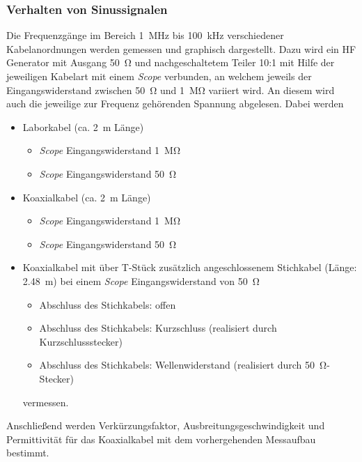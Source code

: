 \documentclass[a4paper,twoside,final]{article}
\begin{document}
\subsubsection{Verhalten von Sinussignalen}
Die Frequenzgänge im Bereich \SI{1}{\mega\hertz} bis \SI{100}{\kilo\hertz} verschiedener Kabelanordnungen werden gemessen und graphisch dargestellt. Dazu wird ein HF Generator mit Ausgang \SI{50}{\ohm} und nachgeschaltetem Teiler 10:1 mit Hilfe der jeweiligen Kabelart mit einem \textit{Scope} verbunden, an welchem jeweils der Eingangswiderstand zwischen \SI{50}{\ohm} und \SI{1}{\mega\ohm} variiert wird. An diesem wird auch die jeweilige zur Frequenz gehörenden Spannung abgelesen. Dabei werden
\begin{itemize}
  \item Laborkabel (ca. \SI{2}{\metre} Länge)
  \begin{itemize}
    \item \textit{Scope} Eingangswiderstand \SI{1}{\mega\ohm}
    \item \textit{Scope} Eingangswiderstand \SI{50}{\ohm}
  \end{itemize}
  \item{Koaxialkabel (ca. \SI{2}{\metre} Länge)}
  \begin{itemize}
    \item \textit{Scope} Eingangswiderstand \SI{1}{\mega\ohm}
    \item \textit{Scope} Eingangswiderstand \SI{50}{\ohm}
  \end{itemize}
  \item Koaxialkabel mit über T-Stück zusätzlich angeschlossenem Stichkabel (Länge: \SI{2,48}{\metre}) bei einem \textit{Scope} Eingangswiderstand von \SI{50}{\ohm}
  \begin{itemize}
    \item Abschluss des Stichkabels: offen
    \item Abschluss des Stichkabels: Kurzschluss (realisiert durch Kurzschlussstecker)
    \item Abschluss des Stichkabels: Wellenwiderstand (realisiert durch \SI{50}{\ohm}- Stecker)
  \end{itemize}
  vermessen.
\end{itemize}

Anschließend werden Verkürzungsfaktor, Ausbreitungsgeschwindigkeit und Permittivität für das Koaxialkabel mit dem vorhergehenden Messaufbau bestimmt.
\end{document}

